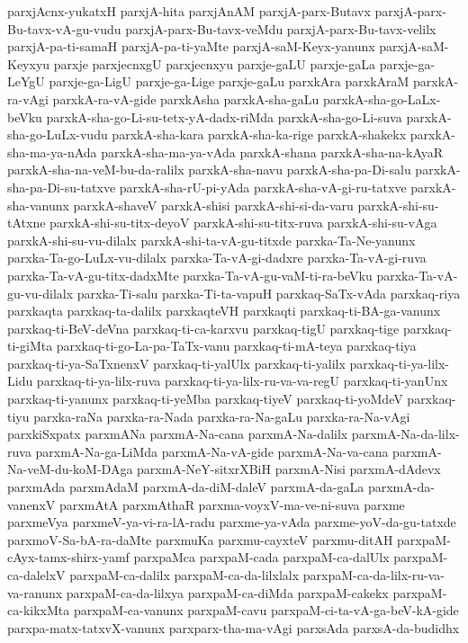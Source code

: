 {parxjAcnx-yukatxH
parxjA-hita
parxjAnAM
parxjA-parx-Butavx
parxjA-parx-Bu-tavx-vA-gu-vudu
parxjA-parx-Bu-tavx-veMdu
parxjA-parx-Bu-tavx-velilx
parxjA-pa-ti-samaH
parxjA-pa-ti-yaMte
parxjA-saM-Keyx-yanunx
parxjA-saM-Keyxyu
parxje
parxjecnxgU
parxjecnxyu
parxje-gaLU
parxje-gaLa
parxje-ga-LeYgU
parxje-ga-LigU
parxje-ga-Lige
parxje-gaLu
parxkAra
parxkAraM
parxkA-ra-vAgi
parxkA-ra-vA-gide
parxkAsha
parxkA-sha-gaLu
parxkA-sha-go-LaLx-beVku
parxkA-sha-go-Li-su-tetx-yA-dadx-riMda
parxkA-sha-go-Li-suva
parxkA-sha-go-LuLx-vudu
parxkA-sha-kara
parxkA-sha-ka-rige
parxkA-shakekx
parxkA-sha-ma-ya-nAda
parxkA-sha-ma-ya-vAda
parxkA-shana
parxkA-sha-na-kAyaR
parxkA-sha-na-veM-bu-da-ralilx
parxkA-sha-navu
parxkA-sha-pa-Di-salu
parxkA-sha-pa-Di-su-tatxve
parxkA-sha-rU-pi-yAda
parxkA-sha-vA-gi-ru-tatxve
parxkA-sha-vanunx
parxkA-shaveV
parxkA-shisi
parxkA-shi-si-da-varu
parxkA-shi-su-tAtxne
parxkA-shi-su-titx-deyoV
parxkA-shi-su-titx-ruva
parxkA-shi-su-vAga
parxkA-shi-su-vu-dilalx
parxkA-shi-ta-vA-gu-titxde
parxka-Ta-Ne-yanunx
parxka-Ta-go-LuLx-vu-dilalx
parxka-Ta-vA-gi-dadxre
parxka-Ta-vA-gi-ruva
parxka-Ta-vA-gu-titx-dadxMte
parxka-Ta-vA-gu-vaM-ti-ra-beVku
parxka-Ta-vA-gu-vu-dilalx
parxka-Ti-salu
parxka-Ti-ta-vapuH
parxkaq-SaTx-vAda
parxkaq-riya
parxkaqta
parxkaq-ta-dalilx
parxkaqteVH
parxkaqti
parxkaq-ti-BA-ga-vanunx
parxkaq-ti-BeV-deVna
parxkaq-ti-ca-karxvu
parxkaq-tigU
parxkaq-tige
parxkaq-ti-giMta
parxkaq-ti-go-La-pa-TaTx-vanu
parxkaq-ti-mA-teya
parxkaq-tiya
parxkaq-ti-ya-SaTxnenxV
parxkaq-ti-yalUlx
parxkaq-ti-yalilx
parxkaq-ti-ya-lilx-Lidu
parxkaq-ti-ya-lilx-ruva
parxkaq-ti-ya-lilx-ru-va-va-regU
parxkaq-ti-yanUnx
parxkaq-ti-yanunx
parxkaq-ti-yeMba
parxkaq-tiyeV
parxkaq-ti-yoMdeV
parxkaq-tiyu
parxka-raNa
parxka-ra-Nada
parxka-ra-Na-gaLu
parxka-ra-Na-vAgi
parxkiSxpatx
parxmANa
parxmA-Na-cana
parxmA-Na-dalilx
parxmA-Na-da-lilx-ruva
parxmA-Na-ga-LiMda
parxmA-Na-vA-gide
parxmA-Na-va-cana
parxmA-Na-veM-du-koM-DAga
parxmA-NeY-sitxrXBiH
parxmA-Nisi
parxmA-dAdevx
parxmAda
parxmAdaM
parxmA-da-diM-daleV
parxmA-da-gaLa
parxmA-da-vanenxV
parxmAtA
parxmAthaR
parxma-voyxV-ma-ve-ni-suva
parxme
parxmeVya
parxmeV-ya-vi-ra-lA-radu
parxme-ya-vAda
parxme-yoV-da-gu-tatxde
parxmoV-Sa-bA-ra-daMte
parxmuKa
parxmu-cayxteV
parxmu-ditAH
parxpaM-cAyx-tamx-shirx-yamf
parxpaMca
parxpaM-cada
parxpaM-ca-dalUlx
parxpaM-ca-dalelxV
parxpaM-ca-dalilx
parxpaM-ca-da-lilxlalx
parxpaM-ca-da-lilx-ru-va-va-ranunx
parxpaM-ca-da-lilxya
parxpaM-ca-diMda
parxpaM-cakekx
parxpaM-ca-kikxMta
parxpaM-ca-vanunx
parxpaM-cavu
parxpaM-ci-ta-vA-ga-beV-kA-gide
parxpa-matx-tatxvX-vanunx
parxparx-tha-ma-vAgi
parxsAda
parxsA-da-budidhx
}
